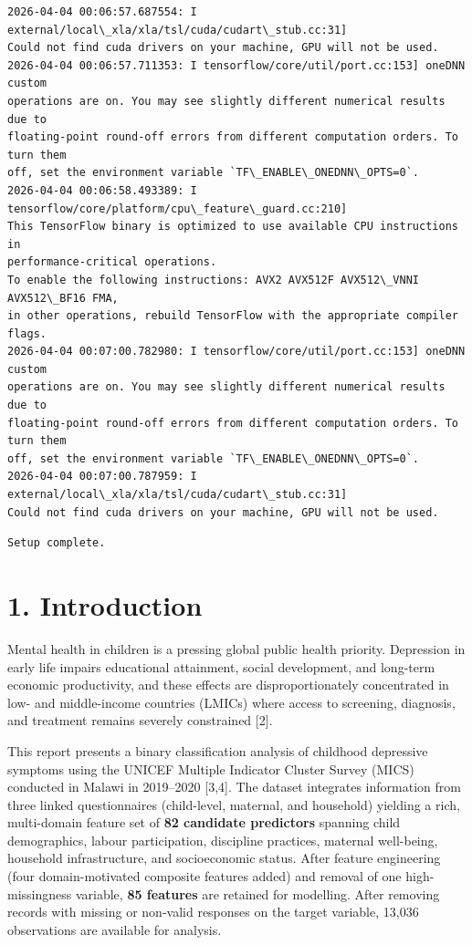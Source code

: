 \documentclass[11pt]{article}
\begin{document}
    \begin{Verbatim}[commandchars=\\\{\}]
2026-04-04 00:06:57.687554: I external/local\_xla/xla/tsl/cuda/cudart\_stub.cc:31]
Could not find cuda drivers on your machine, GPU will not be used.
2026-04-04 00:06:57.711353: I tensorflow/core/util/port.cc:153] oneDNN custom
operations are on. You may see slightly different numerical results due to
floating-point round-off errors from different computation orders. To turn them
off, set the environment variable `TF\_ENABLE\_ONEDNN\_OPTS=0`.
2026-04-04 00:06:58.493389: I tensorflow/core/platform/cpu\_feature\_guard.cc:210]
This TensorFlow binary is optimized to use available CPU instructions in
performance-critical operations.
To enable the following instructions: AVX2 AVX512F AVX512\_VNNI AVX512\_BF16 FMA,
in other operations, rebuild TensorFlow with the appropriate compiler flags.
2026-04-04 00:07:00.782980: I tensorflow/core/util/port.cc:153] oneDNN custom
operations are on. You may see slightly different numerical results due to
floating-point round-off errors from different computation orders. To turn them
off, set the environment variable `TF\_ENABLE\_ONEDNN\_OPTS=0`.
2026-04-04 00:07:00.787959: I external/local\_xla/xla/tsl/cuda/cudart\_stub.cc:31]
Could not find cuda drivers on your machine, GPU will not be used.
    \end{Verbatim}

    \begin{Verbatim}[commandchars=\\\{\}]
Setup complete.
    \end{Verbatim}

    \hypertarget{introduction}{%
\section{1. Introduction}\label{introduction}}

Mental health in children is a pressing global public health priority.
Depression in early life impairs educational attainment, social
development, and long-term economic productivity, and these effects are
disproportionately concentrated in low- and middle-income countries
(LMICs) where access to screening, diagnosis, and treatment remains
severely constrained {[}2{]}.

This report presents a binary classification analysis of childhood
depressive symptoms using the UNICEF Multiple Indicator Cluster Survey
(MICS) conducted in Malawi in 2019--2020 {[}3,4{]}. The dataset
integrates information from three linked questionnaires (child-level,
maternal, and household) yielding a rich, multi-domain feature set of
\textbf{82 candidate predictors} spanning child demographics, labour
participation, discipline practices, maternal well-being, household
infrastructure, and socioeconomic status. After feature engineering
(four domain-motivated composite features added) and removal of one
high-missingness variable, \textbf{85 features} are retained for
modelling. After removing records with missing or non-valid responses on
the target variable, 13,036 observations are available for analysis.
\end{document}

